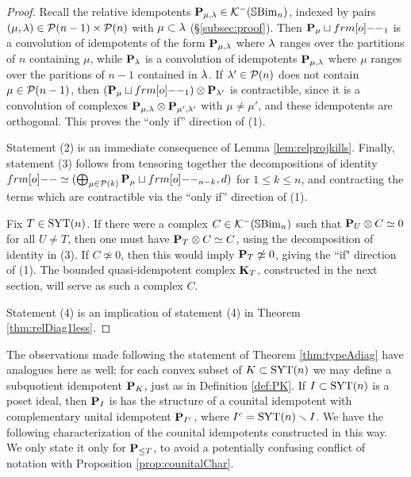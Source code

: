 \begin{proof} 
Recall the relative idempotents ${\mathbf P}_{\mu,\lambda}\in {\mathcal{K}}^-({\mathbb{S}}{\rm Bim }_n)$, indexed by pairs $(\mu,\lambda)\in {\mathcal{P}}(n-1)\times {\mathcal{P}}(n)$ with $\mu\subset \lambda$ (\S \ref{subsec:proof}).  Then $\PB_{\mu}\sqcup \one_1$ is a convolution of idempotents of the form ${\mathbf P}_{\mu,\lambda}$ where $\lambda$ ranges over the partitions of $n$ containing $\mu$, while ${\mathbf P}_\lambda$ is a convolution of idempotents ${\mathbf P}_{\mu,\lambda}$ where $\mu$ ranges over the paritions of $n-1$ contained in $\lambda$.  If $\lambda'\in {\mathcal{P}}(n)$ does not contain $\mu\in {\mathcal{P}}(n-1)$, then $(\PB_{\mu}\sqcup \one_1) \otimes \PB_{\l'}$ is contractible, since it is a convolution of complexes ${\mathbf P}_{\mu,\lambda}\otimes {\mathbf P}_{\mu',\lambda'}$ with $\mu\neq \mu'$, and these idempotents are orthogonal.  This proves the ``only if'' direction of (1).

Statement (2) is an immediate consequence of Lemma \ref{lem:relprojkills}.  Finally, statement (3) follows from tensoring together the decompositions of identity $\one\simeq (\bigoplus_{\mu\in \PC(k)} \PB_{\mu}\sqcup \one_{n-k},d)$ for $1\leq k\leq n$, and contracting the terms which are contractible via the ``only if'' direction of (1).

Fix $T \in \operatorname{SYT}(n)$. If there were a complex $C \in {\mathcal{K}}^-({\mathbb{S}}{\rm Bim }_n)$ such that ${\mathbf P}_U \otimes C \simeq 0$ for all $U \ne T$, then one must have ${\mathbf P}_T \otimes C \simeq C$, using the decomposition of identity in (3).  If $C\not \simeq 0$, then this would imply ${\mathbf P}_T\not\simeq 0$, giving the ``if" direction of (1). The bounded quasi-idempotent complex ${\mathbf K}_T$, constructed in the next section, will serve as such a complex $C$.

Statement (4) is an implication of statement (4) in Theorem \ref{thm:relDiag1less}.
\end{proof}

The observations made following the statement of Theorem \ref{thm:typeAdiag} have analogues here as well: for each convex subset of $K\subset \operatorname{SYT}(n)$ we may define a subquotient idempotent ${\mathbf P}_K$, just as in Definition \ref{def:PK}.  If $I\subset \operatorname{SYT}(n)$ is a poset ideal, then ${\mathbf P}_I$ is has the structure of a counital idempotent with complementary unital idempotent ${\mathbf P}_{I^c}$, where $I^c=\operatorname{SYT}(n)\smallsetminus I$.  We have the following characterization of the counital idempotents constructed in this way.  We only state it only for ${\mathbf P}_{\leq T}$, to avoid a potentially confusing conflict of notation with Proposition \ref{prop:counitalChar}.


